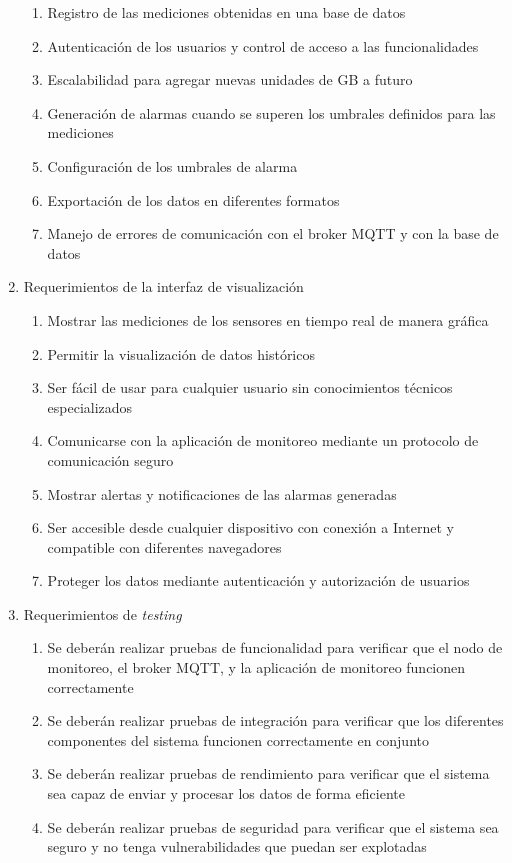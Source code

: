 \documentclass[
11pt, %
]{charter}
\begin{document}
\begin{enumerate}
\begin{enumerate}
			\item Registro de las mediciones obtenidas en una base de datos
			\item Autenticación de los usuarios y control de acceso a las funcionalidades
			\item Escalabilidad para agregar nuevas unidades de GB a futuro
			\item Generación de alarmas cuando se superen los umbrales definidos para las mediciones
			\item Configuración de los umbrales de alarma
			\item Exportación de los datos en diferentes formatos
			\item Manejo de errores de comunicación con el broker MQTT y con la base de datos
		\end{enumerate}	
	\item Requerimientos de la interfaz de visualización
		\begin{enumerate}
			\item Mostrar las mediciones de los sensores en tiempo real de manera gráfica
			\item Permitir la visualización de datos históricos
			\item Ser fácil de usar para cualquier usuario sin conocimientos técnicos especializados
			\item Comunicarse con la aplicación de monitoreo mediante un protocolo de comunicación seguro 
			\item Mostrar alertas y notificaciones de las alarmas generadas
			\item Ser accesible desde cualquier dispositivo con conexión a Internet y compatible con diferentes navegadores
			\item Proteger los datos mediante autenticación y autorización de usuarios
			
		\end{enumerate}	
	\item Requerimientos de \textit{testing}
		\begin{enumerate}
			\item Se deberán realizar pruebas de funcionalidad para verificar que el nodo de monitoreo, el broker MQTT, y la aplicación de monitoreo funcionen correctamente
			\item Se deberán realizar pruebas de integración para verificar que los diferentes componentes del sistema funcionen correctamente en conjunto
			\item Se deberán realizar pruebas de rendimiento para verificar que el sistema sea capaz de enviar y procesar los datos de forma eficiente
			\item Se deberán realizar pruebas de seguridad para verificar que el sistema sea seguro y no tenga vulnerabilidades que puedan ser explotadas
		\end{enumerate}	
\end{enumerate}
\end{document}
